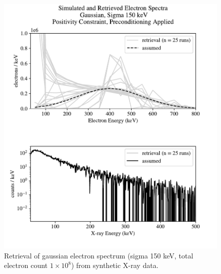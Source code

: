 \begin{figure}[p]
    \centering
    \includegraphics[width=\textwidth]{figures/chapter_4/synthetic_data_examples/gauss_150keV_posonly_preconditioning_1e8_particles}
    \caption{Retrieval of gaussian electron spectrum (sigma 150 keV, total electron count $1\times10^8$) from synthetic X-ray data.}
    \label{why_non_negative_is_good}
\end{figure}

